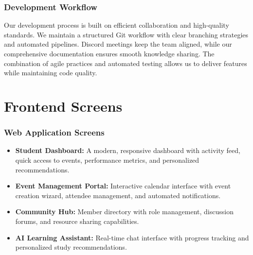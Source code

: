 \subsubsection{Development Workflow}
\label{subsubsec:dev_workflow}

Our development process is built on efficient collaboration and high-quality standards. We maintain a structured Git workflow with clear branching strategies and automated pipelines. Discord meetings keep the team aligned, while our comprehensive documentation ensures smooth knowledge sharing. The combination of agile practices and automated testing allows us to deliver features while maintaining code quality.

\section{Frontend Screens}
\label{subsec:frontend_screens}

\subsubsection{Web Application Screens}
\label{subsubsec:web_screens}

\begin{itemize}
    \item \textbf{Student Dashboard:} A modern, responsive dashboard with activity feed, quick access to events, performance metrics, and personalized recommendations.
    
    \item \textbf{Event Management Portal:} Interactive calendar interface with event creation wizard, attendee management, and automated notifications.
    
    \item \textbf{Community Hub:} Member directory with role management, discussion forums, and resource sharing capabilities.
    
    \item \textbf{AI Learning Assistant:} Real-time chat interface with progress tracking and personalized study recommendations.
\end{itemize}

